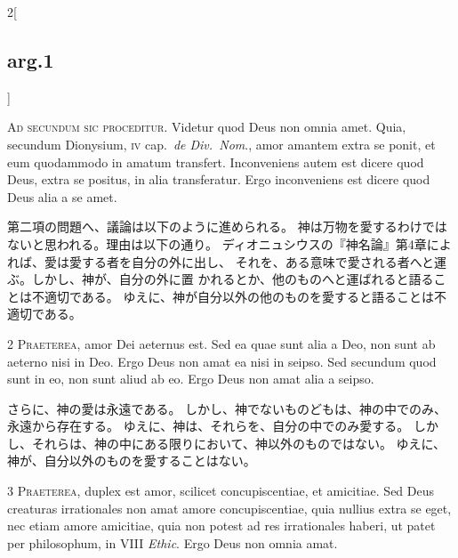 \documentclass[paper=a4paper,fontsize=10pt,jafontsize=9pt,titlepage]{jlreq}
\begin{document}
\begin{paracol}{2}[\subsection{arg.1}]


{\Huge A}{\scshape d secundum sic proceditur}. Videtur quod
Deus non omnia amet. Quia, secundum Dionysium, {\scshape iv} cap.~{\itshape de Div.~Nom}.,
amor amantem extra se ponit, et eum quodammodo in amatum
transfert. Inconveniens autem est dicere quod Deus, extra se positus, in
alia transferatur. Ergo inconveniens est dicere quod Deus alia a se
amet.

\switchcolumn

第二項の問題へ、議論は以下のように進められる。
神は万物を愛するわけではないと思われる。理由は以下の通り。
ディオニュシウスの『神名論』第4章によれば、愛は愛する者を自分の外に出し、
それを、ある意味で愛される者へと運ぶ。しかし、神が、自分の外に置
 かれるとか、他のものへと運ばれると語ることは不適切である。
ゆえに、神が自分以外の他のものを愛すると語ることは不適切である。



{\scshape 2 Praeterea}, amor Dei aeternus est. Sed ea
quae sunt alia a Deo, non sunt ab aeterno nisi in Deo. Ergo Deus non
amat ea nisi in seipso. Sed secundum quod sunt in eo, non sunt aliud ab
eo. Ergo Deus non amat alia a seipso.

\switchcolumn

さらに、神の愛は永遠である。
しかし、神でないものどもは、神の中でのみ、永遠から存在する。
ゆえに、神は、それらを、自分の中でのみ愛する。
しかし、それらは、神の中にある限りにおいて、神以外のものではない。
ゆえに、神が、自分以外のものを愛することはない。



{\scshape 3 Praeterea}, duplex est amor, scilicet
concupiscentiae, et amicitiae. Sed Deus creaturas irrationales non amat
amore concupiscentiae, quia nullius extra se eget, nec etiam amore
amicitiae, quia non potest ad res irrationales haberi, ut patet per
philosophum, in VIII {\itshape Ethic}. Ergo Deus non omnia amat.


\end{paracol}
\end{document}
